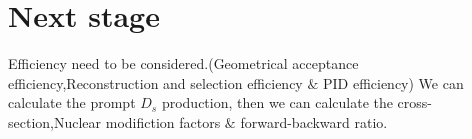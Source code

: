 \documentclass[
10pt, %
a4paper, %
oneside, %
headinclude,footinclude, %
BCOR5mm, %
]{scrartcl}
\begin{document}

\section{Next stage}

Efficiency need to be considered.(Geometrical acceptance efficiency,Reconstruction and selection efficiency $\&$ PID efficiency) We can calculate the prompt $D_s$ production, then we can calculate the cross-section,Nuclear modifiction factors $\&$ forward-backward ratio. 

\renewcommand{\refname}{\spacedlowsmallcaps{References}} %




\end{document}
